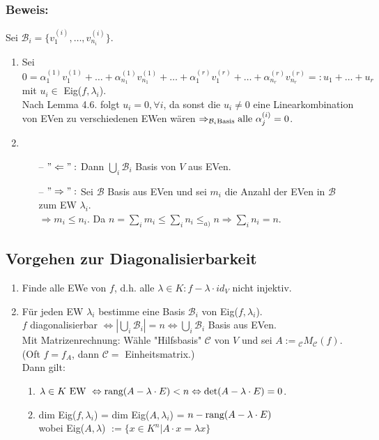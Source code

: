 \documentclass[a4paper, 12pt]{extarticle}
\newcommand{\tn}[1]{\textnormal {#1}}
\begin{document}
\subsubsection*{Beweis:}
Sei $\mathcal{B}_i = \{v_1^{(i)}, \dots, v_{n_i}^{(i)}\}$.
\begin{enumerate}[label=\alph*)]
	\item Sei $0 = \alpha_1^{(1)} v_1^{(1)} + \dots + \alpha_{n_1}^{(1)} v_{n_1}^{(1)} + \dots + \alpha_1^{(r)} v_1^{(r)} + \dots + \alpha_{n_r}^{(r)} v_{n_r}^{(r)} =: u_1 + \dots + u_r$\\
	mit $u_i \in $ Eig($f, \lambda_i$).\\
	Nach Lemma 4.6. folgt $u_i = 0, \forall i$, da sonst die $u_i \neq 0$ eine Linearkombination von EVen zu verschiedenen EWen wären $\Rightarrow_{\mathcal{B}_i \tn{Basis}} \tn{alle } \alpha_j^{(i)} = 0$.
	\item 
	\begin{itemize}
		\item [--] $"\Leftarrow":$ Dann $\bigcup_i \mathcal{B}_i$ Basis von $V$ aus EVen.
		\item [--] $"\Rightarrow":$ Sei $\mathcal{B}$ Basis aus EVen und sei $m_i$ die Anzahl der EVen in $\mathcal{B}$ zum EW $\lambda_i$.\\
		$\Rightarrow m_i \leq n_i$. Da $n = \sum_i m_i \leq \sum_i n_i \leq_{a)} n \Rightarrow \sum_i n_i = n$.
	\end{itemize}
\end{enumerate}

\subsection*{Vorgehen zur Diagonalisierbarkeit}
\begin{enumerate}[label=\arabic*)]
	\item Finde alle EWe von $f$, d.h. alle $\lambda \in K: f - \lambda\cdot id_V$ nicht injektiv.
	\item Für jeden EW $\lambda_i$ bestimme eine Basis $\mathcal{B}_i$ von Eig($f, \lambda_i$).\\
	$f$ diagonalisierbar $\Leftrightarrow |\bigcup_i \mathcal{B}_i| = n \Leftrightarrow \bigcup_i \mathcal{B}_i$ Basis aus EVen.\\
	Mit Matrizenrechnung: Wähle "Hilfsbasis" $\mathcal{C}$ von $V$ und sei $A := {_\mathcal{C}M_\mathcal{C}}(f)$.\\
	(Oft $f=f_A$, dann $\mathcal{C} = $ Einheitsmatrix.)\\
	Dann gilt:
	\begin{enumerate}
		\item $\lambda \in K \tn{ EW } \Leftrightarrow \tn{rang}(A - \lambda \cdot E) < n \Leftrightarrow \tn{det}(A - \lambda \cdot E) = 0$.
		\item dim Eig($f, \lambda_i$) = dim Eig($A, \lambda_i$) = $n - \tn{rang}(A - \lambda \cdot E)$\\ wobei Eig($A, \lambda$) $:= \{x \in K^n | A \cdot x = \lambda x\}$
	\end{enumerate}
\end{enumerate}
\end{document}
